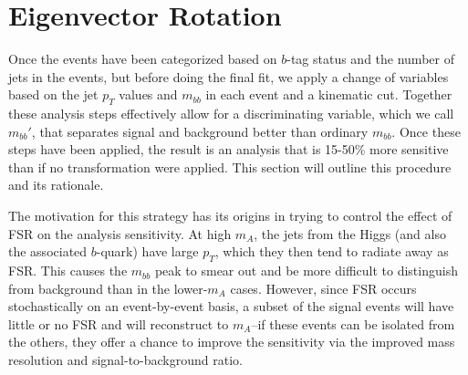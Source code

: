\section{Eigenvector Rotation}
\label{sec:rotation}

Once the events have been categorized based on $b$-tag status and the number of jets in the
events, but before doing the final fit, we apply a change of variables based on the jet
$p_T$ values and $m_{bb}$ in each event and a kinematic cut.  Together these analysis 
steps effectively allow for a discriminating variable, which we call $m_{bb}'$, that
separates signal and background better than ordinary $m_{bb}$.  Once these steps have
been applied, the result is an analysis that is 15-50\% more sensitive
than if no transformation were applied.  This section will 
outline this procedure and its rationale.  

The motivation for this strategy has its origins in trying to control the effect of
FSR on the analysis sensitivity.  At high $m_A$, the jets from the Higgs (and also 
the associated $b$-quark) have large $p_T$, which they then tend to radiate away 
as FSR.  This causes the $m_{bb}$ peak to smear out and be more difficult to 
distinguish from background than in the lower-$m_A$ cases.  However, since FSR
occurs stochastically on an event-by-event basis, a subset of the signal events
will have little or no FSR and will reconstruct to $m_A$--if these events 
can be isolated from the others, they offer a chance to improve the sensitivity
via the improved mass resolution and signal-to-background ratio. 

